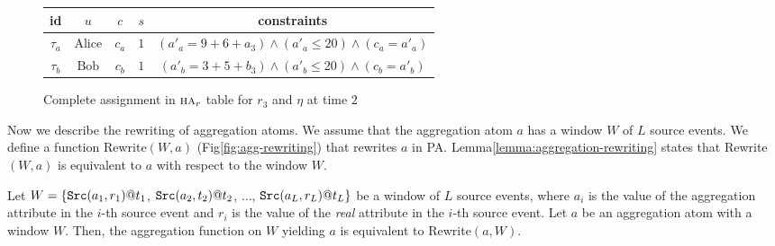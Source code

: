 \begin{figure}[ht]
  \centering
  \begin{small}
  \begin{tabular}{|c|c|c|c|c|}
  \hline
  id          & $u$             & $c$    & $s$ & {constraints}  \\
  \hline\hline
  $\tau_a$  & $\mbox{Alice}$    & $c_a$  & $1$ & $(a'_a = 9 + 6 + a_3) \land (a'_a \leq 20) \land (c_a = a'_a)$ \\
  \hline
  $\tau_b$  & $\mbox{Bob}$      & $c_b$  & $1$ & $(a'_b = 3 + 5 + b_3) \land (a'_b \leq 20) \land (c_b = a'_b)$ \\
  \hline
\end{tabular}
\end{small}
  \caption{Complete assignment in $\HEAD/_r$ table for $r_3$ and $\eta$ at time $2$}
  \label{fig:complete-head-assignments-r3}
\end{figure}

Now we describe the rewriting of aggregation atoms.
We assume that the aggregation atom $a$ has a window $W$ of $L$ source events.
We define a function {\sf Rewrite}$(W, a)$ (Fig\:\ref{fig:agg-rewriting})
that rewrites $a$ in PA.
Lemma\:\ref{lemma:aggregation-rewriting} states that {\sf Rewrite}$(W, a)$
is equivalent to $a$ with respect to the window $W$.

\begin{lemma}\label{lemma:aggregation-rewriting}
Let $W=\{
\mbox{\tt Src}(a_1, r_1)@t_1$, $\mbox{\tt Src}(a_2, t_2)@t_2$,
$\dots$, $\mbox{\tt Src}(a_L, r_L)@t_{L}\}$
be a window of $L$ source events,
where $a_i$ is the value of the aggregation attribute in the $i$-th source event
and $r_i$ is the value of the {\em real} attribute in the $i$-th source event. 
Let $a$ be an aggregation atom with a window $W$.
Then, the aggregation function on $W$ yielding $a$ is equivalent to {\sf Rewrite}$(a, W)$.
\end{lemma}

